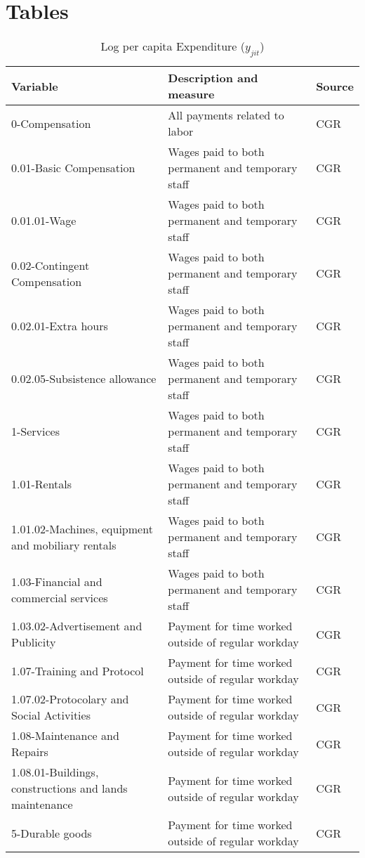 \section*{Tables}

\begin{table}[ht]
\caption{Log per capita Expenditure ($y_{jit}$)}
\centering
\begin{adjustbox}{max width=\textwidth}
\begin{tabular}{l l l}
\hline\hline
Variable & Description and measure & Source \\ [0.5ex] 
\hline
0-Compensation & All payments related to labor & CGR\\
0.01-Basic Compensation & Wages paid to both permanent and temporary staff & CGR\\
0.01.01-Wage & Wages paid to both permanent and temporary staff & CGR\\
0.02-Contingent Compensation & Wages paid to both permanent and temporary staff & CGR\\
0.02.01-Extra hours & Wages paid to both permanent and temporary staff & CGR\\
0.02.05-Subsistence allowance & Wages paid to both permanent and temporary staff & CGR\\
1-Services & Wages paid to both permanent and temporary staff & CGR\\
1.01-Rentals & Wages paid to both permanent and temporary staff & CGR\\
1.01.02-Machines, equipment and mobiliary rentals & Wages paid to both permanent and temporary staff & CGR\\
1.03-Financial and commercial services & Wages paid to both permanent and temporary staff & CGR\\
1.03.02-Advertisement and Publicity & Payment for time worked outside of regular workday & CGR\\
1.07-Training and Protocol & Payment for time worked outside of regular workday & CGR\\
1.07.02-Protocolary and Social Activities & Payment for time worked outside of regular workday & CGR\\
1.08-Maintenance and Repairs & Payment for time worked outside of regular workday & CGR\\
1.08.01-Buildings, constructions and lands maintenance & Payment for time worked outside of regular workday & CGR\\
5-Durable goods & Payment for time worked outside of regular workday & CGR\\

\end{tabular}
\end{adjustbox}
\end{table}
